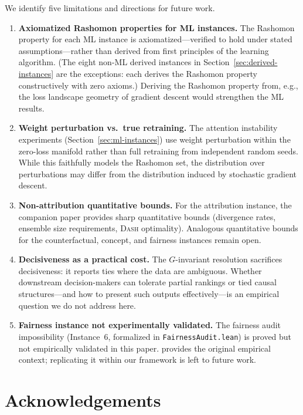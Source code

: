 \documentclass[11pt,a4paper]{article}
\newcommand{\DASH}{\textsc{Dash}}
\begin{document}
We identify five limitations and directions for future work.
\begin{enumerate}[label=(\arabic*)]
  \item \textbf{Axiomatized Rashomon properties for ML instances.}  The
    Rashomon property for each ML instance is axiomatized---verified to hold
    under stated assumptions---rather than derived from first principles of the
    learning algorithm.  (The eight non-ML derived instances in
    Section~\ref{sec:derived-instances} are the exceptions: each derives the
    Rashomon property constructively with zero axioms.)  Deriving the Rashomon
    property from, e.g., the loss landscape geometry of gradient descent would
    strengthen the ML results.
  \item \textbf{Weight perturbation vs.\ true retraining.}  The attention
    instability experiments (Section~\ref{sec:ml-instances}) use weight
    perturbation within the zero-loss manifold rather than full retraining from
    independent random seeds.  While this faithfully models the Rashomon set,
    the distribution over perturbations may differ from the distribution induced
    by stochastic gradient descent.
  \item \textbf{Non-attribution quantitative bounds.}  For the attribution
    instance, the companion paper provides sharp quantitative bounds (divergence
    rates, ensemble size requirements, \DASH{} optimality).  Analogous
    quantitative bounds for the counterfactual, concept, and fairness instances
    remain open.
  \item \textbf{Decisiveness as a practical cost.}  The $G$-invariant
    resolution sacrifices decisiveness: it reports ties where the data are
    ambiguous.  Whether downstream decision-makers can tolerate partial rankings
    or tied causal structures---and how to present such outputs
    effectively---is an empirical question we do not address here.
  \item \textbf{Fairness instance not experimentally validated.}  The fairness
    audit impossibility (Instance~6, formalized in \texttt{FairnessAudit.lean})
    is proved but not empirically validated in this paper.
    \citet{chouldechova2017fair} provides the original empirical context;
    replicating it within our framework is left to future work.
\end{enumerate}

\section*{Acknowledgements}
\end{document}
